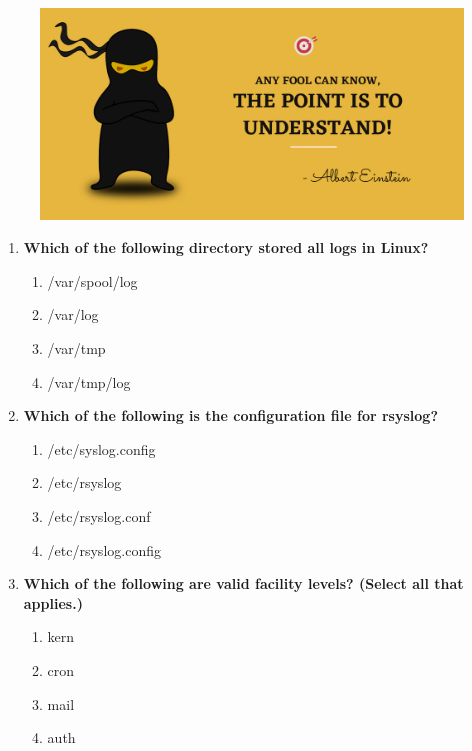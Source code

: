 \setlength{\columnsep}{3pt}
\begin{flushleft}
	
	\paragraph{}
	\bigskip
	
	\begin{figure}[h!]
		\centering
		\includegraphics[scale=.2]{content/practise.jpg}
	\end{figure}	
	\begin{enumerate}
		
		\item \textbf{Which of the following directory stored all logs in Linux?}
		\begin{enumerate}[label=(\alph*)]
			\item /var/spool/log
			\item /var/log   %
			\item /var/tmp  
			\item /var/tmp/log
		\end{enumerate}
		\bigskip
		\bigskip	
		

		\item \textbf{Which of the following is the configuration file for rsyslog?}
		\begin{enumerate}[label=(\alph*)]
			\item /etc/syslog.config
			\item /etc/rsyslog
			\item /etc/rsyslog.conf     %
			\item /etc/rsyslog.config
		\end{enumerate}
		\bigskip
		\bigskip	
		
		\item \textbf{Which of the following are valid facility levels? (Select all that applies.)}
		\begin{enumerate}[label=(\alph*)]
			\item kern   %
			\item cron  %
			\item mail  %
			\item auth   %
		\end{enumerate}
		\bigskip
		\bigskip	
		

\end{enumerate}
\end{flushleft}
